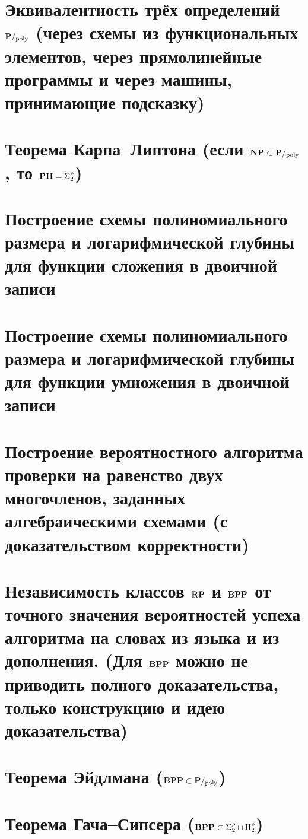 \section{Эквивалентность трёх определений $\textbf{P}/_{\text{poly}}$ (через схемы из функциональных элементов, через прямолинейные программы и через машины, принимающие подсказку)}

\newpage

\section{Теорема Карпа–Липтона (если $\textbf{NP} \subset \textbf{P}/_{\mathrm{poly}}$, то $\textbf{PH} = \Sigma_2^p$)}


\section{Построение схемы полиномиального размера и логарифмической глубины для функции сложения в двоичной записи}

\newpage

\section{Построение схемы полиномиального размера и логарифмической глубины для функции умножения в двоичной записи}


\section{Построение вероятностного алгоритма проверки на равенство двух многочленов, заданных алгебраическими схемами (с доказательством корректности)}


\section{Независимость классов $\textbf{RP}$ и $\textbf{BPP}$ от точного значения вероятностей успеха алгоритма на словах из языка и из дополнения. (Для $\textbf{BPP}$ можно не приводить полного доказательства, только конструкцию и идею доказательства)}


\section{Теорема Эйдлмана ($\textbf{BPP} \subset \textbf{P}/_{\mathrm{poly}}$)}


\section{Теорема Гача–Сипсера ($\textbf{BPP} \subset \Sigma_2^p \cap \Pi_2^p$)}


